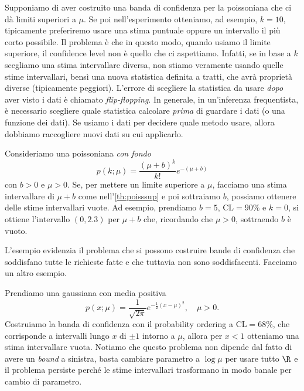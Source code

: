 
Supponiamo di aver costruito una banda di confidenza per la poissoniana che ci dà limiti superiori a $\mu$.
Se poi nell'esperimento otteniamo, ad esempio, $k=10$,
tipicamente preferiremo usare una stima puntuale oppure un intervallo il più corto possibile.
Il problema è che in questo modo, quando usiamo il limite superiore,
il confidence level non è quello che ci aspettiamo.
Infatti, se in base a $k$ scegliamo una stima intervallare diversa,
non stiamo veramente usando quelle stime intervallari,
bensì una nuova statistica definita a tratti,
che avrà proprietà diverse (tipicamente peggiori).
L'errore di scegliere la statistica da usare \emph{dopo}
aver visto i dati è chiamato \emph{flip-flopping}.
In generale, in un'inferenza frequentista,
è necessario scegliere quale statistica calcolare \emph{prima}
di guardare i dati (o una funzione dei dati).
Se usiamo i dati per decidere quale metodo usare,
allora dobbiamo raccogliere nuovi dati su cui applicarlo.

\begin{example}
	Consideriamo una poissoniana \emph{con fondo}
	\begin{equation*}
		p(k;\mu)
		= \frac{(\mu+b)^k}{k!}e^{-(\mu+b)}
	\end{equation*}
	con $b>0$ e $\mu>0$.
	Se, per mettere un limite superiore a $\mu$,
	facciamo una stima intervallare di $\mu+b$ come nell'\autoref{th:poisssup} e poi sottraiamo $b$,
	possiamo ottenere delle stime intervallari vuote.
	Ad esempio, prendiamo $b=5$, $\mathrm{CL}=\SI{90}\%$ e $k=0$,
	si ottiene l'intervallo $(0,2.3)$ per $\mu+b$ che,
	ricordando che $\mu>0$, sottraendo $b$ è vuoto.
\end{example}

L'esempio evidenzia il problema che si possono costruire bande di confidenza
che soddisfano tutte le richieste fatte e che tuttavia non sono soddisfacenti.
Facciamo un altro esempio.

\begin{example}
	Prendiamo una gaussiana con media positiva
	\begin{equation*}
		p(x;\mu)
		= \frac1{\sqrt{2\pi}} e^{-\frac12(x-\mu)^2}, \quad \mu>0.
	\end{equation*}
	Costruiamo la banda di confidenza con il probability ordering a $\mathrm{CL}=\SI{68}\%$,
	che corrisponde a intervalli lungo $x$ di $\pm1$ intorno a $\mu$,
	allora per $x<1$ otteniamo una stima intervallare vuota.
	Notiamo che questo problema non dipende dal fatto di avere un \emph{bound} a sinistra,
	basta cambiare parametro a $\log\mu$ per usare tutto $\R$ e il problema persiste perché
	le stime intervallari trasformano in modo banale per cambio di parametro.
\end{example}

